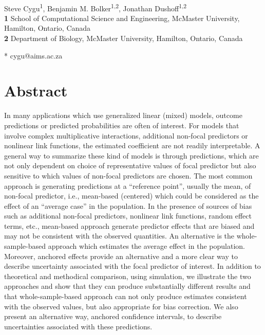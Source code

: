 \begin{flushleft}
{\Large
\textbf{} %
}
\newline
\\
Steve Cygu\textsuperscript{1},
Benjamin M. Bolker\textsuperscript{1,2},
Jonathan Dushoff\textsuperscript{1,2}
\\
\bigskip
\textbf{1} School of Computational Science and Engineering, McMaster University, Hamilton, Ontario, Canada
\\
\textbf{2} Department of Biology, McMaster University, Hamilton, Ontario, Canada
\\
\bigskip


* cygu@aims.ac.za

\end{flushleft}
\section*{Abstract}

In many applications which use generalized linear (mixed) models, outcome predictions or predicted probabilities are often of interest. For models that involve complex multiplicative interactions, additional non-focal predictors or nonlinear link functions, the estimated coefficient are not readily interpretable. A general way to summarize these kind of models is through predictions, which are not only dependent on choice of representative values of focal predictor but also sensitive to which values of non-focal predictors are chosen. The most common approach is generating predictions at a ``reference point'', usually the mean, of non-focal predictor, i.e., mean-based (centered) which could be considered as the effect of an ``average case'' in the population. In the presence of sources of bias such as additional non-focal predictors, nonlinear link functions, random effect terms, etc., mean-based approach generate predictor effects that are biased and may not be consistent with the observed quantities. An alternative is the whole-sample-based approach which estimates the average effect in the population. Moreover, anchored effects provide an alternative and a more clear way to describe uncertainty associated with the focal predictor of interest. In addition to theoretical and methodical comparison, using simulation, we illustrate the two approaches and show that they can produce substantially different results and that whole-sample-based approach can not only produce estimates consistent with the observed values, but also appropriate for bias correction. We also present an alternative way, anchored confidence intervals, to describe uncertainties associated with these predictions.

